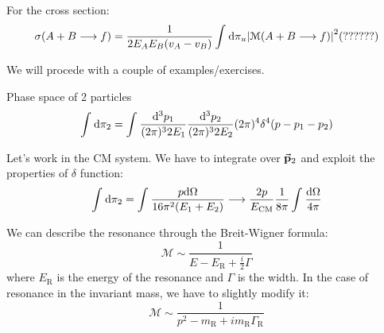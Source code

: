 \documentclass[../../main/main.tex]{subfiles}
\begin{document}
For the cross section:
\begin{equation}
    \sigma(A + B \longrightarrow f)
    =
    \frac{1}{2 E_A E_B (v_A - v_B)} \int_{}^{} \mathrm{d}{\pi_u} \abs{\mathcal{M}(A + B \longrightarrow f)}^2 (??????)
    \label{eq:}
\end{equation}

We will procede with a couple of examples/exercises.
\begin{example}{Phase space of 2 particles}{}
    \begin{equation}
        \int_{}^{} \mathrm{d}{\pi_2}
        =
        \int_{}^{} \frac{\mathrm{d}{^3 p_1}}{(2\pi)^3 2 E_1} \frac{\mathrm{d}{^3 p_2}}{(2\pi)^3 2 E_2} (2\pi)^4 \delta^4 \qty(p - p_1 - p_2 )
        \label{eq:}
    \end{equation}

    Let's work in the CM system. We have to integrate over \( \va{p}_2 \) and exploit the properties of \( \delta \) function:
    \begin{equation}
        \int_{}^{} \mathrm{d}{\pi_2}
        =
        \int_{}^{} \frac{p \mathrm{d}{\Omega}}{16 \pi^2 (E_1 + E_2)}
        \longrightarrow
        \frac{2p}{E_\mathrm{CM}} \frac{1}{8\pi} \int_{}^{} \frac{\mathrm{d}{\Omega}}{4\pi}
        \label{eq:}
    \end{equation}

    We can describe the resonance through the Breit-Wigner formula:
    \begin{equation}
        \mathcal{M}
        \sim
        \frac{1}{E - E_\mathrm{R} + \frac{i}{2} \Gamma}
        \label{eq:}
    \end{equation}
    where \( E_\mathrm{R} \) is the energy of the resonance and \( \Gamma \) is the width. In the case of resonance in the invariant mass, we have to slightly modify it:
    \begin{equation}
        \mathcal{M}
        \sim
        \frac{1}{p^2 - m_\mathrm{R} + i m_\mathrm{R}\Gamma_\mathrm{R}}
        \label{eq:}
    \end{equation}
\end{example}
\end{document}
